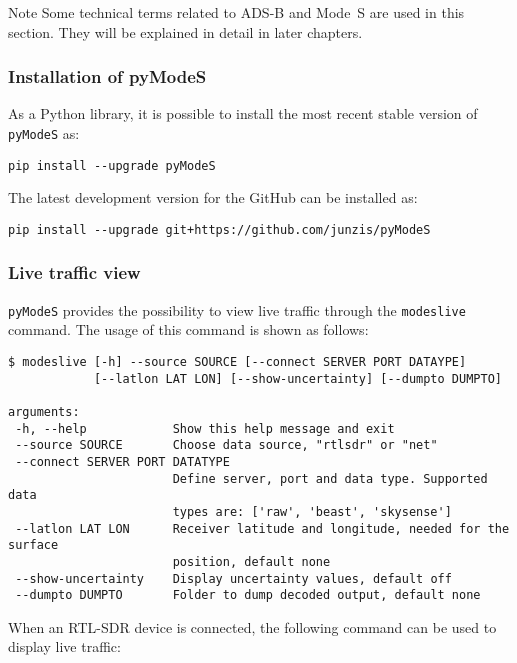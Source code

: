 \begin{notebox}{Note}
  Some technical terms related to ADS-B and Mode~S are used in this section. They will be explained in detail in later chapters.
\end{notebox}

\subsubsection{Installation of pyModeS}

As a Python library, it is possible to install the most recent stable version of \texttt{pyModeS} as:

\begin{verbatim}
pip install --upgrade pyModeS
\end{verbatim}

The latest development version for the GitHub can be installed as:

\begin{verbatim}
pip install --upgrade git+https://github.com/junzis/pyModeS
\end{verbatim}


\subsubsection{Live traffic view}

\texttt{pyModeS} provides the possibility to view live traffic through the \texttt{modeslive} command. The usage of this command is shown as follows:

\begin{verbatim}
$ modeslive [-h] --source SOURCE [--connect SERVER PORT DATAYPE]
            [--latlon LAT LON] [--show-uncertainty] [--dumpto DUMPTO]

arguments:
 -h, --help            Show this help message and exit
 --source SOURCE       Choose data source, "rtlsdr" or "net"
 --connect SERVER PORT DATATYPE
                       Define server, port and data type. Supported data
                       types are: ['raw', 'beast', 'skysense']
 --latlon LAT LON      Receiver latitude and longitude, needed for the surface
                       position, default none
 --show-uncertainty    Display uncertainty values, default off
 --dumpto DUMPTO       Folder to dump decoded output, default none
\end{verbatim}

When an RTL-SDR device is connected, the following command can be used to display live traffic:

